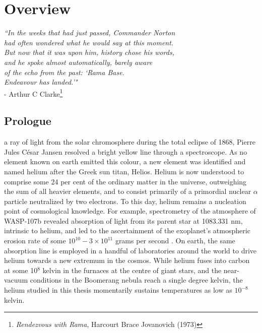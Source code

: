 

\chapter*{Overview}

\setcounter{page}{0}
\begin{adjustwidth}{3cm}{0cm}
\begin{flushright}
\singlespacing
{\emph{``In the weeks that had just passed, Commander Norton\\
had often wondered what he would say at this moment.\\
But now that it was upon him, history chose his words,\\
and he spoke almost	automatically, 	barely aware \\
of the echo from the past: `Rama Base.\\
 \emph{Endeavour} has landed.'"}\\ 
- Arthur C Clarke\footnote{\emph{Rendezvous with Rama}, Harcourt Brace Jovanovich (1973)}}
\end{flushright}
\end{adjustwidth}
\onehalfspacing
\vspace{1cm}


\section*{Prologue}\label{sec:prologue}


	 a ray of light from the solar chromosphere during the total eclipse of 1868, Pierre Jules C\'{e}sar Jansen resolved a bright yellow line through a spectroscope.
	As no element known on earth emitted this colour, a new element was identified and named helium after the Greek sun titan, Helios. Helium is now understood to comprise some 24 per cent of the ordinary matter in the universe, outweighing the sum of all heavier elements, and to consist primarily of a primordial nuclear $\alpha$ particle neutralized by two electrons. To this day, helium remains a nucleation point of cosmological knowledge. For example, spectrometry of the atmosphere of WASP-107b revealed absorption of light from its parent star at 1083.331 nm, intrinsic to helium, and led to the ascertainment of the exoplanet's atmospheric erosion rate of some $10^{10}-3\times10^{11}$ grams per second \cite{Spake18}. On earth, the same absorption line is employed in a handful of laboratories around the world to drive helium towards a new extremum in the cosmos. While helium fuses into carbon at some 10$^8$ kelvin in the furnaces at the centre of giant stars, and the near-vacuum conditions in the Boomerang nebula reach a single degree kelvin, the helium studied in this thesis momentarily sustains temperatures as low as $10^{-8}$ kelvin.

